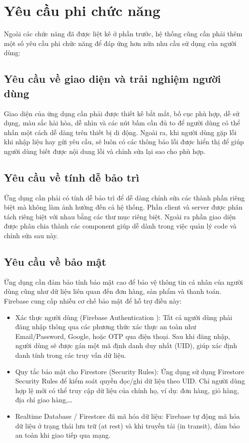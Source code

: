 \documentclass[../DoAn.tex]{subfiles}
\begin{document}
\section{Yêu cầu phi chức năng}
\label{section:2.4}
Ngoài các chức năng đã được liệt kê ở phần trước, hệ thống cũng cần phải thêm một số yêu cầu phi chức năng để đáp ứng hơn nữa nhu cầu sử dụng của người dùng:
\subsection{Yêu cầu về giao diện và trải nghiệm người dùng}
Giao diện của ứng dụng cần phải được thiết kế bắt mắt, bố cục phù hợp, dễ sử dụng, màu sắc hài hòa, dễ nhìn và các nút bấm cần đủ to để người dùng có thể nhấn một cách dễ dàng trên thiết bị di động. Ngoài ra, khi người dùng gặp lỗi khi nhập liệu hay gửi yêu cầu, sẽ luôn có các thông báo lỗi được hiển thị để giúp người dùng biết được nội dung lỗi và chỉnh sửa lại sao cho phù hợp.

\subsection{Yêu cầu về tính dễ bảo trì}
Ứng dụng cần phải có tính dễ bảo trì để dễ dàng chỉnh sửa các thành phần riêng biệt mà không làm ảnh hưởng đến cả hệ thống. Phần client và server được phân tách riêng biệt với nhau bằng các thư mục riêng biệt. Ngoài ra phần giao diện được phân chia thành các component giúp dễ dành trong việc quản lý code và chỉnh sửa sau này.

\subsection{Yêu cầu về bảo mật}
Ứng dụng cần đảm bảo tính bảo mật cao để bảo vệ thông tin cá nhân của người dùng cũng như dữ liệu liên quan đến đơn hàng, sản phẩm và thanh toán. Firebase cung cấp nhiều cơ chế bảo mật để hỗ trợ điều này:
\begin{itemize}
     

\item Xác thực người dùng (Firebase Authentication \cite{FirebaseAuth}): Tất cả người dùng phải đăng nhập thông qua các phương thức xác thực an toàn như Email/Password, Google, hoặc OTP qua điện thoại. Sau khi đăng nhập, người dùng sẽ được gán một mã định danh duy nhất (UID), giúp xác định danh tính trong các truy vấn dữ liệu.

\item Quy tắc bảo mật cho Firestore \cite{FirebaseFirestore} (Security Rules): Ứng dụng sử dụng Firestore Security Rules để kiểm soát quyền đọc/ghi dữ liệu theo UID. Chỉ người dùng hợp lệ mới có thể truy cập dữ liệu của chính họ, ví dụ: đơn hàng, giỏ hàng, địa chỉ giao hàng,…

\item Realtime Database / Firestore \cite{FirebaseFirestore} đã mã hóa dữ liệu: Firebase tự động mã hóa dữ liệu ở trạng thái lưu trữ (at rest) và khi truyền tải (in transit), đảm bảo an toàn khi giao tiếp qua mạng. 
\end{itemize}
\end{document}
